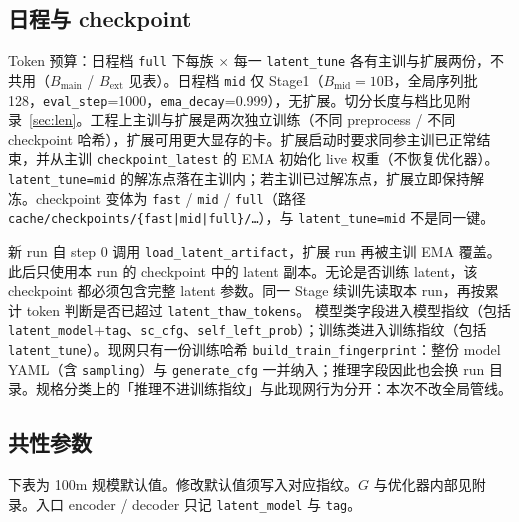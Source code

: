 \documentclass[UTF8,a4paper,11pt]{ctexart}
\begin{document}
\subsection{日程与 checkpoint}

Token 预算：日程档 \texttt{full} 下每族 \(\times\) 每一 \texttt{latent\_tune} 各有主训与扩展两份，不共用（\(B_{\mathrm{main}}\) / \(B_{\mathrm{ext}}\) 见表）。日程档 \texttt{mid} 仅 Stage1（\(B_{\mathrm{mid}}=10\mathrm{B}\)，全局序列批 128，\texttt{eval\_step}=1000，\texttt{ema\_decay}=0.999），无扩展。切分长度与档比见附录~\ref{sec:len}。工程上主训与扩展是两次独立训练（不同 preprocess / 不同 checkpoint 哈希），扩展可用更大显存的卡。扩展启动时要求同参主训已正常结束，并从主训 \texttt{checkpoint\_latest} 的 EMA 初始化 live 权重（不恢复优化器）。\texttt{latent\_tune=mid} 的解冻点落在主训内；若主训已过解冻点，扩展立即保持解冻。checkpoint 变体为 \texttt{fast} / \texttt{mid} / \texttt{full}（路径 \texttt{cache/checkpoints/\{fast|mid|full\}/\ldots}），与 \texttt{latent\_tune=mid} 不是同一键。

新 run 自 step 0 调用 \texttt{load\_latent\_artifact}，扩展 run 再被主训 EMA 覆盖。此后只使用本 run 的 checkpoint 中的 latent 副本。无论是否训练 latent，该 checkpoint 都必须包含完整 latent 参数。同一 Stage 续训先读取本 run，再按累计 token 判断是否已超过 \texttt{latent\_thaw\_tokens}。
模型类字段进入模型指纹（包括 \texttt{latent\_model}+\texttt{tag}、\texttt{sc\_cfg}、\texttt{self\_left\_prob}）；训练类进入训练指纹（包括 \texttt{latent\_tune}）。现网只有一份训练哈希 \texttt{build\_train\_fingerprint}：整份 model YAML（含 \texttt{sampling}）与 \texttt{generate\_cfg} 一并纳入；推理字段因此也会换 run 目录。规格分类上的「推理不进训练指纹」与此现网行为分开：本次不改全局管线。

\subsection{共性参数}

下表为 100m 规模默认值。修改默认值须写入对应指纹。\(G\) 与优化器内部见附录。入口 encoder / decoder 只记 \texttt{latent\_model} 与 \texttt{tag}。
\end{document}
